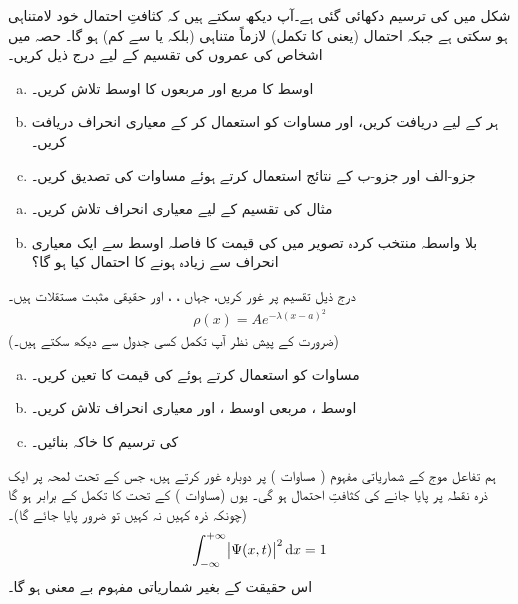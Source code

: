 شکل  میں  کی ترسیم دکھائی گئی ہے۔آپ دیکھ سکتے ہیں کہ کثافتِ احتمال خود لامتناہی ہو سکتی ہے جبکہ احتمال (یعنی  کا تکمل) لازماً متناہی (بلکہ  یا  سے کم) ہو گا۔
 حصہ  میں اشخاص کی عمروں کی تقسیم کے لیے درج ذیل کریں۔ 
\begin{enumerate}[a.]
\item
اوسط کا مربع  اور مربعوں کا اوسط  تلاش کریں۔ 
\item
 ہر  کے لیے  دریافت کریں، اور مساوات  کو استعمال کر کے معیاری انحراف دریافت کریں۔
\item
 جزو-الف اور جزو-ب کے نتائج استعمال کرتے ہوئے مساوات  کی تصدیق کریں۔ 
\end{enumerate}
\begin{enumerate}[a.]
\item
 مثال   کی تقسیم کے لیے معیاری انحراف تلاش کریں۔
\item
بلا واسطہ منتخب کردہ تصویر میں       کی قیمت  کا فاصلہ اوسط سے ایک معیاری انحراف سے   زیادہ  ہونے کا احتمال کیا ہو گا؟
\end{enumerate}
درج ذیل   تقسیم پر غور کریں، جہاں ،  ، اور  حقیقی مثبت مستقلات ہیں۔ 
\begin{align*}
\rho(x)=Ae^{-\lambda(x-a)^2}
\end{align*}
 (ضرورت کے پیش نظر  آپ تکمل کسی جدول سے دیکھ سکتے ہیں۔)
\begin{enumerate}[a.]
\item
مساوات  کو  استعمال کرتے ہوئے  کی قیمت کا تعین کریں۔
\item
اوسط ، مربعی اوسط  ، اور معیاری انحراف   تلاش کریں۔
\item
{} کی ترسیم کا خاکہ بنائیں۔
\end{enumerate}

ہم تفاعل موج کے شماریاتی مفہوم ( مساوات ) پر دوبارہ غور کرتے ہیں، جس کے تحت لمحہ  پر ایک ذرہ  نقطہ  پر پایا جانے کی کثافتِ احتمال  ہو گی۔ یوں (مساوات ) کے تحت  کا تکمل  کے برابر ہو گا (چونکہ ذرہ کہیں نہ کہیں تو ضرور پایا جائے گا)۔ 
\begin{align}\label{مساوات_تفاعل_موج_احتمال_اکائی}
\int_{-\infty}^{+\infty}\abs{\Psi(x,t)}^2\dif x = 1
\end{align}
اس حقیقت کے بغیر شماریاتی مفہوم بے معنی ہو گا۔ 


